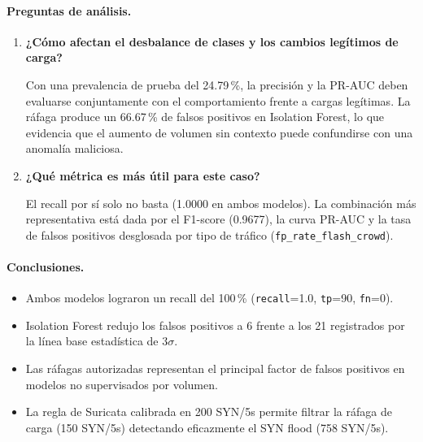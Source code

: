\paragraph{Preguntas de análisis.}
\begin{enumerate}[leftmargin=*, topsep=2pt, itemsep=2pt]
\item \textbf{¿Cómo afectan el desbalance de clases y los cambios legítimos de carga?}\par
Con una prevalencia de prueba del 24.79\,\%, la precisión y la PR-AUC deben evaluarse conjuntamente con el comportamiento frente a cargas legítimas. La ráfaga produce un 66.67\,\% de falsos positivos en Isolation Forest, lo que evidencia que el aumento de volumen sin contexto puede confundirse con una anomalía maliciosa.
\item \textbf{¿Qué métrica es más útil para este caso?}\par
El recall por sí solo no basta (1.0000 en ambos modelos). La combinación más representativa está dada por el F1-score (0.9677), la curva PR-AUC y la tasa de falsos positivos desglosada por tipo de tráfico (\texttt{fp\_rate\_flash\_crowd}).
\end{enumerate}

\paragraph{Conclusiones.}
\begin{itemize}
\item Ambos modelos lograron un recall del 100\,\% (\texttt{recall}=1.0, \texttt{tp}=90, \texttt{fn}=0).
\item Isolation Forest redujo los falsos positivos a 6 frente a los 21 registrados por la línea base estadística de $3\sigma$.
\item Las ráfagas autorizadas representan el principal factor de falsos positivos en modelos no supervisados por volumen.
\item La regla de Suricata calibrada en 200 SYN/5s permite filtrar la ráfaga de carga (150 SYN/5s) detectando eficazmente el SYN flood (758 SYN/5s).
\end{itemize}

